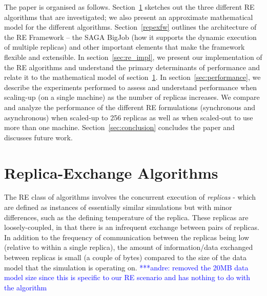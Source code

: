 \documentclass{rspublic}
\newcommand{\jhanote}[1]{ {\textcolor{red} { ***shantenu: #1 }}}
\newcommand{\alnote}[1]{ {\textcolor{blue} { ***andre: #1 }}}
\newcommand{\athotanote}[1]{ {\textcolor{green} { ***athota: #1 }}}
\newcommand{\alnote}[1]{}
\newcommand{\athotanote}[1]{}
\newcommand{\jhanote}[1]{}
\begin{document}
The paper is organised as follows. Section~\ref{sec:repex-approach}
sketches out the three different RE algorithms that are investigated;
we also present an approximate mathematical model for the different
algorithms.  Section~\ref{repexfw} outlines the architecture of the RE
Framework -- the SAGA BigJob (how it supports the dynamic execution of
multiple replicas) and other important elements that make the
framework flexible and extensible.  In section~\ref{sec:re_impl}, we
present our implementation of the RE algorithms and understand the
primary determinants of performance and relate it to the mathematical
model of section~\ref{sec:repex-approach}.  In section~\ref{sec:performance}, we
describe the experiments performed to assess and understand
performance when scaling-up (on a single machine) as the number of
replicas increases.  We compare and analyze the performance of the
different RE formulations (synchronous and asynchronous) when
scaled-up to 256 replicas as well as when scaled-out to use more than
one machine. Section~\ref{sec:conclusion} concludes the paper and
discusses future work.




\section{Replica-Exchange Algorithms}\label{sec:repex-approach}

The RE class of algorithms involves the concurrent execution of
\emph{replicas} - which are defined as instances of essentially
similar simulations but with minor differences, such as the defining
temperature of the replica. These replicas are loosely-coupled, in
that there is an infrequent exchange between pairs of 
replicas. In addition to the frequency of communication between the
replicas being low (relative to within a single replica), the amount
of information/data exchanged between replicas is small (a couple of bytes) 
compared to the size of the data model that the simulation is 
operating on. 
\alnote{removed the 20MB data model size since this is specific to our RE scenario 
and has nothing to do with the algorithm}
\end{document}
